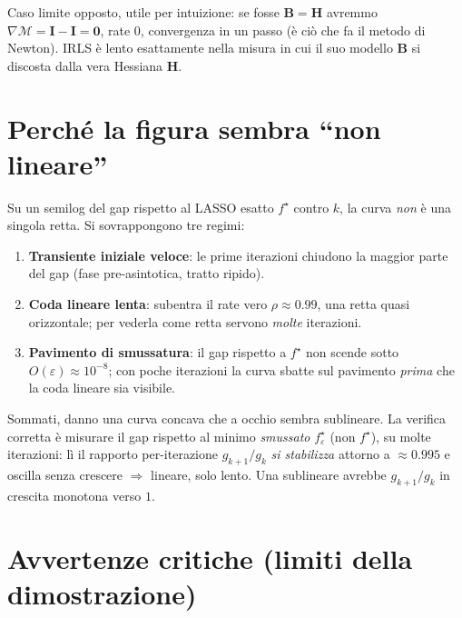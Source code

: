\documentclass[11pt,a4paper]{article}
\theoremstyle{definition}
\newcommand{\Hess}{\bm{H}}
\newcommand{\Id}{\bm{I}}
\newcommand{\Mmap}{\mathcal{M}}
\newcommand{\spec}{\rho}
\newcommand{\eps}{\varepsilon}
\begin{document}
\noindent Caso limite opposto, utile per intuizione: se fosse $\bm B=\Hess$ avremmo
$\nabla\Mmap=\Id-\Id=\bm0$, rate $0$, convergenza in un passo (è ciò che fa il metodo di
Newton). IRLS è lento esattamente nella misura in cui il suo modello $\bm B$ si discosta dalla
vera Hessiana $\Hess$.

\section{Perché la figura sembra ``non lineare''}
\label{sec:figure}

Su un semilog del gap rispetto al LASSO esatto $f^\star$ contro $k$, la curva \emph{non} è una
singola retta. Si sovrappongono tre regimi:
\begin{enumerate}[nosep]
\item \textbf{Transiente iniziale veloce}: le prime iterazioni chiudono la maggior parte del
  gap (fase pre-asintotica, tratto ripido).
\item \textbf{Coda lineare lenta}: subentra il rate vero $\spec\approx0.99$, una retta quasi
  orizzontale; per vederla come retta servono \emph{molte} iterazioni.
\item \textbf{Pavimento di smussatura}: il gap rispetto a $f^\star$ non scende sotto
  $O(\eps)\approx10^{-8}$; con poche iterazioni la curva sbatte sul pavimento \emph{prima}
  che la coda lineare sia visibile.
\end{enumerate}
Sommati, danno una curva concava che a occhio sembra sublineare. La verifica corretta è
misurare il gap rispetto al minimo \emph{smussato} $f_\eps^\star$ (non $f^\star$), su molte
iterazioni: lì il rapporto per-iterazione $g_{k+1}/g_k$ \emph{si stabilizza} attorno a
$\approx0.995$ e oscilla senza crescere $\Rightarrow$ lineare, solo lento. Una sublineare
avrebbe $g_{k+1}/g_k$ in crescita monotona verso $1$.

\section{Avvertenze critiche (limiti della dimostrazione)}
\label{sec:caveats}
\end{document}
